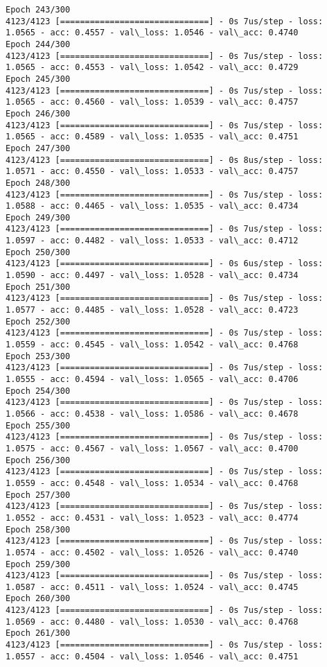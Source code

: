 \documentclass[11pt]{article}
\begin{document}
\begin{Verbatim}[commandchars=\\\{\}]
Epoch 243/300
4123/4123 [==============================] - 0s 7us/step - loss: 1.0565 - acc: 0.4557 - val\_loss: 1.0546 - val\_acc: 0.4740
Epoch 244/300
4123/4123 [==============================] - 0s 7us/step - loss: 1.0565 - acc: 0.4553 - val\_loss: 1.0542 - val\_acc: 0.4729
Epoch 245/300
4123/4123 [==============================] - 0s 7us/step - loss: 1.0565 - acc: 0.4560 - val\_loss: 1.0539 - val\_acc: 0.4757
Epoch 246/300
4123/4123 [==============================] - 0s 7us/step - loss: 1.0565 - acc: 0.4589 - val\_loss: 1.0535 - val\_acc: 0.4751
Epoch 247/300
4123/4123 [==============================] - 0s 8us/step - loss: 1.0571 - acc: 0.4550 - val\_loss: 1.0533 - val\_acc: 0.4757
Epoch 248/300
4123/4123 [==============================] - 0s 7us/step - loss: 1.0588 - acc: 0.4465 - val\_loss: 1.0535 - val\_acc: 0.4734
Epoch 249/300
4123/4123 [==============================] - 0s 7us/step - loss: 1.0597 - acc: 0.4482 - val\_loss: 1.0533 - val\_acc: 0.4712
Epoch 250/300
4123/4123 [==============================] - 0s 6us/step - loss: 1.0590 - acc: 0.4497 - val\_loss: 1.0528 - val\_acc: 0.4734
Epoch 251/300
4123/4123 [==============================] - 0s 7us/step - loss: 1.0577 - acc: 0.4485 - val\_loss: 1.0528 - val\_acc: 0.4723
Epoch 252/300
4123/4123 [==============================] - 0s 7us/step - loss: 1.0559 - acc: 0.4545 - val\_loss: 1.0542 - val\_acc: 0.4768
Epoch 253/300
4123/4123 [==============================] - 0s 7us/step - loss: 1.0555 - acc: 0.4594 - val\_loss: 1.0565 - val\_acc: 0.4706
Epoch 254/300
4123/4123 [==============================] - 0s 7us/step - loss: 1.0566 - acc: 0.4538 - val\_loss: 1.0586 - val\_acc: 0.4678
Epoch 255/300
4123/4123 [==============================] - 0s 7us/step - loss: 1.0575 - acc: 0.4567 - val\_loss: 1.0567 - val\_acc: 0.4700
Epoch 256/300
4123/4123 [==============================] - 0s 7us/step - loss: 1.0559 - acc: 0.4548 - val\_loss: 1.0534 - val\_acc: 0.4768
Epoch 257/300
4123/4123 [==============================] - 0s 7us/step - loss: 1.0552 - acc: 0.4531 - val\_loss: 1.0523 - val\_acc: 0.4774
Epoch 258/300
4123/4123 [==============================] - 0s 7us/step - loss: 1.0574 - acc: 0.4502 - val\_loss: 1.0526 - val\_acc: 0.4740
Epoch 259/300
4123/4123 [==============================] - 0s 7us/step - loss: 1.0587 - acc: 0.4511 - val\_loss: 1.0524 - val\_acc: 0.4745
Epoch 260/300
4123/4123 [==============================] - 0s 7us/step - loss: 1.0569 - acc: 0.4480 - val\_loss: 1.0530 - val\_acc: 0.4768
Epoch 261/300
4123/4123 [==============================] - 0s 7us/step - loss: 1.0557 - acc: 0.4504 - val\_loss: 1.0546 - val\_acc: 0.4751

\end{Verbatim}
\end{document}
